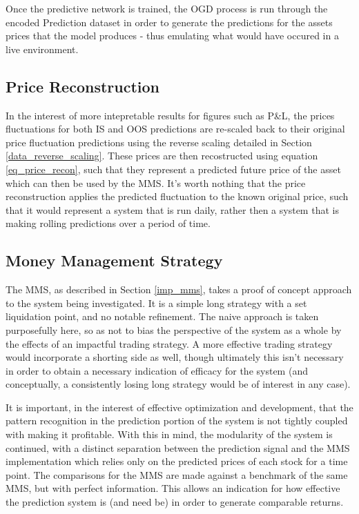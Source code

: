 \documentclass[a4paper,11pt,oneside]{article}
\theoremstyle{plain}
\theoremstyle{definition}
\begin{document}
	Once the predictive network is trained, the OGD process is run through the encoded Prediction dataset in order to generate the predictions for the assets prices that the model produces - thus emulating what would have occured in a live environment. \newline
	
	\subsection{Price Reconstruction}\label{proc_precerecon}
	
	In the interest of more intepretable results for figures such as P\&L, the prices fluctuations for both IS and OOS predictions are re-scaled back to their original price fluctuation predictions using the reverse scaling detailed in Section \ref{data_reverse_scaling}. These prices are then recostructed using equation \eqref{eq_price_recon}, such that they represent a predicted future price of the asset which can then be used by the MMS. It's worth nothing that the price reconstruction applies the predicted fluctuation to the known original price, such that it would represent a system that is run daily, rather then a system that is making rolling predictions over a period of time. 
	
	\subsection{Money Management Strategy}\label{proc_mms}
	
	The MMS, as described in Section \ref{imp_mms}, takes a proof of concept approach to the system being investigated. It is a simple long strategy with a set liquidation point, and no notable refinement. The naive approach is taken purposefully here, so as not to bias the perspective of the system as a whole by the effects of an impactful trading strategy. A more effective trading strategy would incorporate a shorting side as well, though ultimately this isn't necessary in order to obtain a necessary indication of efficacy for the system (and conceptually, a consistently losing long strategy would be of interest in any case).  \newline
	
	It is important, in the interest of effective optimization and development, that the pattern recognition in the prediction portion of the system is not tightly coupled with making it profitable. With this in mind, the modularity of the system is continued, with a distinct separation between the prediction signal and the MMS implementation which relies only on the predicted prices of each stock for a time point. The comparisons for the MMS are made against a benchmark of the same MMS, but with perfect information. This allows an indication for how effective the prediction system is (and need be) in order to generate comparable returns. \newline
	
\end{document}
